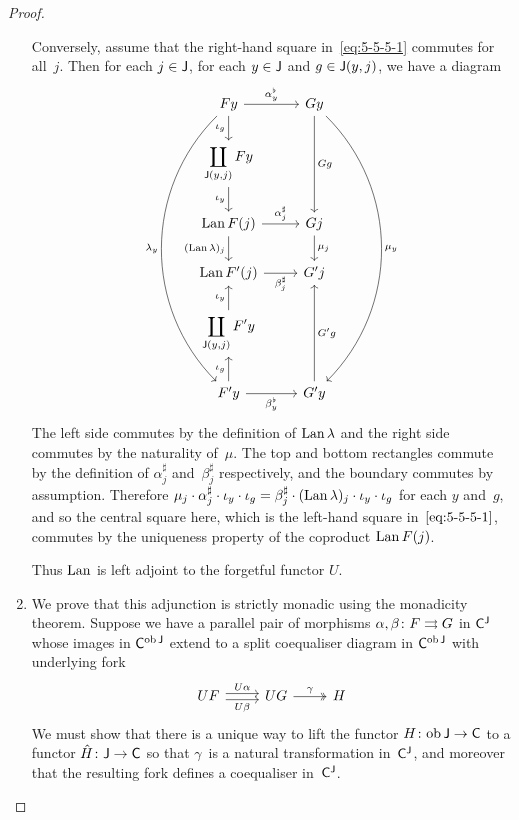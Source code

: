 \documentclass[../../solutions]{subfiles}
\begin{document}
\begin{proof}
\begin{enumerate}[label=(\roman*)]
    Conversely, assume that the right-hand square
    in~\eqref{eq:5-5-5-1} commutes for all~$j$.  Then for each
    $j\in{\mathsf{J}}$, for each $y\in{\mathsf{J}}$ and $g\in{\mathsf{J}}(y,j)$, we have a
    diagram
    $$
    \begin{tikzcd}
      Fy \ar[r, "\alpha^\flat_y"] \ar[d, "\iota_g"']
      \ar[ddddd, bend right=45, "\lambda_y"']
      & Gy \ar[dd, "Gg"]
      \ar[ddddd, bend left=45, "\mu_y"]
      \\
      \displaystyle \coprod_{\sJ(y,j)} Fy \ar[d, "\iota_y"']
      \\
      \Lan F(j) \ar[r, "\alpha^\sharp_j"] \ar[d, "(\Lan\lambda)_j"']
      & Gj \ar[d, "\mu_j"]
      \\
      \Lan F'(j) \ar[r, "\beta^\sharp_j"']
      & G'j
      \\
      \displaystyle \coprod_{\sJ(y,j)} F'y \ar[u, "\iota_y"]
      \\
      F'y \ar[r, "\beta^\flat_y"'] \ar[u, "\iota_g"]
      & G'y \ar[uu, "G'g"']
    \end{tikzcd}
    $$
    The left side commutes by the definition of $\operatorname{Lan}\lambda$ and the
    right side commutes by the naturality of~$\mu$.  The top and
    bottom rectangles commute by the definition of $\alpha^\sharp_j$
    and~$\beta^\sharp_j$ respectively, and the boundary commutes by
    assumption.  Therefore
    $\mu_j\cdot \alpha^\sharp_j\cdot \iota_y \cdot \iota_g =
    \beta^\sharp_j\cdot (\operatorname{Lan} \lambda)_j \cdot \iota_y \cdot \iota_g$
    for each $y$ and~$g$, and so the central square here, which is the
    left-hand square in~$\eqref{eq:5-5-5-1}$, commutes by the
    uniqueness property of the coproduct $\operatorname{Lan} F(j)$.

    Thus $\operatorname{Lan}$ is left adjoint to the forgetful functor $U$.

  \item We prove that this adjunction is strictly monadic using the
    monadicity theorem.  Suppose we have a parallel pair of morphisms
    ${\alpha,\beta}\colon{F}\rightrightarrows{G}$ in ${\mathsf{C}}^{\mathsf{J}}$ whose images in
    ${\mathsf{C}}^{\operatorname{ob}{\mathsf{J}}}$ extend to a split coequaliser diagram in
    ${\mathsf{C}}^{\operatorname{ob}{\mathsf{J}}}$ with underlying fork
    $$
    \begin{tikzcd}
      UF
      \ar[r, shift left=0.5ex, "U\alpha"]
      \ar[r, shift right=0.5ex, "U\beta"']
      & UG
      \ar[r, twoheadrightarrow, "\gamma"]
      & H
    \end{tikzcd}
    $$
    We must show that there is a unique way to lift the functor
    ${H}\colon{\operatorname{ob}{\mathsf{J}}}\to{{\mathsf{C}}}$ to a functor ${\hat H}\colon{{\mathsf{J}}}\to{{\mathsf{C}}}$ so
    that $\gamma$~is a natural transformation in~${\mathsf{C}}^{\mathsf{J}}$, and
    moreover that the resulting fork defines a coequaliser
    in~${\mathsf{C}}^{\mathsf{J}}$.


\end{enumerate}
\end{proof}
\end{document}
